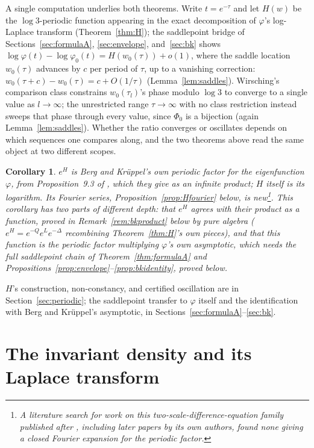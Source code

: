 \documentclass[11pt]{amsart}
\theoremstyle{plain}
\newtheorem{corollary}[theorem]{Corollary}
\theoremstyle{definition}
\theoremstyle{remark}
\begin{document}
A single computation underlies both theorems. Write $t = e^{-\tau}$ and let $H(w)$ be the
$\log 3$-periodic function appearing in the exact decomposition of $\varphi$'s log-Laplace
transform (Theorem~\ref{thm:H}); the saddlepoint bridge of Sections~\ref{sec:formulaA},
\ref{sec:envelope}, and~\ref{sec:bk} shows $\log\varphi(t)-\log\varphi_0(t) = H(w_0(\tau))+o(1)$,
where the saddle
location $w_0(\tau)$ advances by $c$ per period of $\tau$, up to a vanishing correction:
$w_0(\tau+c)-w_0(\tau) = c+O(1/\tau)$ (Lemma~\ref{lem:saddles}). Wirsching's comparison class
constrains $w_0(\tau_l)$'s phase modulo $\log 3$ to converge to a single value as $l\to\infty$; the
unrestricted range $\tau\to\infty$ with no class restriction instead sweeps that phase through
every value, since $\Phi_0$ is a bijection (again Lemma~\ref{lem:saddles}). Whether the ratio
converges or oscillates depends on which sequences one compares along, and the two theorems above
read the same object at two different scopes.

\begin{corollary}
\label{cor:bk}
$e^H$ is Berg and Kr\"uppel's own periodic factor for the eigenfunction $\varphi$, from
Proposition~9.3 of \cite{bergkruppel1998}, which they give as an infinite product; $H$ itself is
its logarithm. Its Fourier series, Proposition~\ref{prop:Hfourier} below, is new\footnote{A
literature search for work on this two-scale-difference-equation family published after
\cite{bergkruppel1998}, including later papers by its own authors, found none giving a closed
Fourier expansion for the periodic factor.}. This corollary
has two parts of different depth: that $e^H$ agrees with their product \emph{as a function},
proved in Remark~\ref{rem:bkproduct} below by pure algebra ($e^H=e^{-Q}e^Le^{-\Delta}$ recombining
Theorem~\ref{thm:H}'s own pieces), and that this function is the periodic factor
multiplying $\varphi$'s own asymptotic, which needs the full saddlepoint chain of
Theorem~\ref{thm:formulaA} and Propositions~\ref{prop:envelope}--\ref{prop:bkidentity}, proved
below.
\end{corollary}

$H$'s construction, non-constancy, and certified oscillation are in Section~\ref{sec:periodic}; the saddlepoint
transfer to $\varphi$ itself and the identification with Berg and Kr\"uppel's asymptotic, in
Sections~\ref{sec:formulaA}--\ref{sec:bk}.

\section{The invariant density and its Laplace transform}
\label{sec:prelim}
\end{document}
